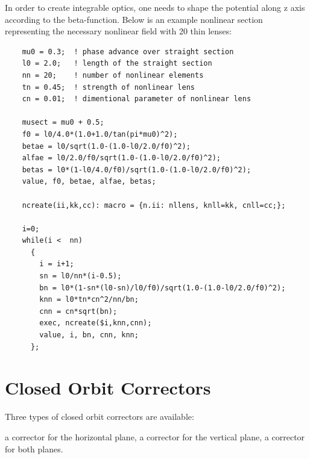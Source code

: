 In order to create integrable optics, one needs to shape the potential
along z axis according to the beta-function. Below is an example
nonlinear section representing the necessary nonlinear field with 20
thin lenses:  
\begin{verbatim}
    mu0 = 0.3;  ! phase advance over straight section
    l0 = 2.0;   ! length of the straight section
    nn = 20;    ! number of nonlinear elements
    tn = 0.45;  ! strength of nonlinear lens
    cn = 0.01;  ! dimentional parameter of nonlinear lens

    musect = mu0 + 0.5;
    f0 = l0/4.0*(1.0+1.0/tan(pi*mu0)^2);
    betae = l0/sqrt(1.0-(1.0-l0/2.0/f0)^2);
    alfae = l0/2.0/f0/sqrt(1.0-(1.0-l0/2.0/f0)^2);
    betas = l0*(1-l0/4.0/f0)/sqrt(1.0-(1.0-l0/2.0/f0)^2);
    value, f0, betae, alfae, betas;

    ncreate(ii,kk,cc): macro = {n.ii: nllens, knll=kk, cnll=cc;};

    i=0;
    while(i <  nn)
      {
        i = i+1;
        sn = l0/nn*(i-0.5);
        bn = l0*(1-sn*(l0-sn)/l0/f0)/sqrt(1.0-(1.0-l0/2.0/f0)^2);
        knn = l0*tn*cn^2/nn/bn;
        cnn = cn*sqrt(bn);
        exec, ncreate($i,knn,cnn);
        value, i, bn, cnn, knn;
      };
\end{verbatim}


  



\section{Closed Orbit Correctors}
\label{sec:closed_orbit_cor}\label{sec:kicker}

Three types of closed orbit correctors are available: 
\begin{madlist}
    a corrector for the horizontal plane, 
    a corrector for the vertical plane, 
    a corrector for both planes. 
\end{madlist}

